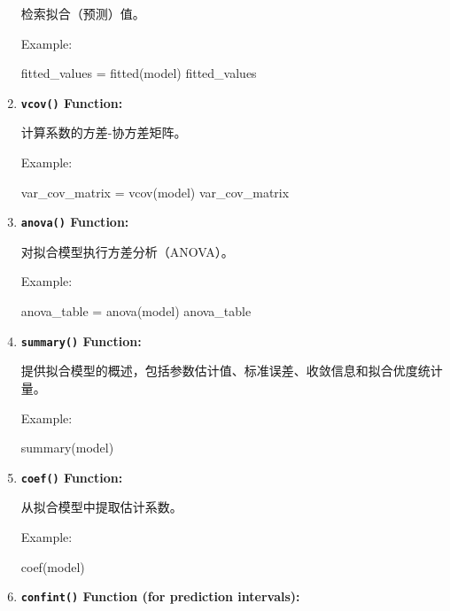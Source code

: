 \documentclass[
]{article}
\newenvironment{Shaded}{}{}
\newcommand{\FunctionTok}[1]{\textcolor[rgb]{0.02,0.16,0.49}{#1}}
\newcommand{\NormalTok}[1]{#1}
\newcommand{\OtherTok}[1]{\textcolor[rgb]{0.00,0.44,0.13}{#1}}
\begin{document}
\begin{enumerate}
  检索拟合（预测）值。

  Example:

\begin{Shaded}
\begin{Highlighting}[]
\NormalTok{fitted\_values }\OtherTok{=} \FunctionTok{fitted}\NormalTok{(model)}
\NormalTok{fitted\_values}
\end{Highlighting}
\end{Shaded}
\item
  \textbf{\texttt{vcov()} Function:}

  计算系数的方差-协方差矩阵。

  Example:

\begin{Shaded}
\begin{Highlighting}[]
\NormalTok{var\_cov\_matrix }\OtherTok{=} \FunctionTok{vcov}\NormalTok{(model)}
\NormalTok{var\_cov\_matrix}
\end{Highlighting}
\end{Shaded}
\item
  \textbf{\texttt{anova()} Function:}

  对拟合模型执行方差分析（ANOVA）。

  Example:

\begin{Shaded}
\begin{Highlighting}[]
\NormalTok{anova\_table }\OtherTok{=} \FunctionTok{anova}\NormalTok{(model)}
\NormalTok{anova\_table}
\end{Highlighting}
\end{Shaded}
\item
  \textbf{\texttt{summary()} Function:}

  提供拟合模型的概述，包括参数估计值、标准误差、收敛信息和拟合优度统计量。

  Example:

\begin{Shaded}
\begin{Highlighting}[]
\FunctionTok{summary}\NormalTok{(model)}
\end{Highlighting}
\end{Shaded}
\item
  \textbf{\texttt{coef()} Function:}

  从拟合模型中提取估计系数。

  Example:

\begin{Shaded}
\begin{Highlighting}[]
\FunctionTok{coef}\NormalTok{(model)}
\end{Highlighting}
\end{Shaded}
\item
  \textbf{\texttt{confint()} Function (for prediction intervals):}


\end{enumerate}
\end{document}
